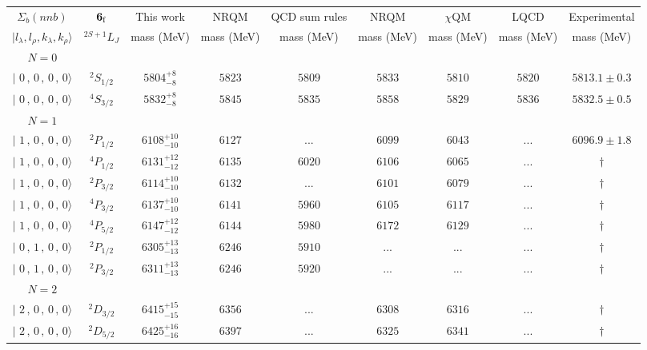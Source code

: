 \begin{tabular}{c c| c c c c c c c}\hline \hline
$\Sigma_{b}(nnb)$& ${\bf {6}}_{\rm f}$& This work   &   NRQM \cite{Yoshida2015}     &  QCD sum rules \cite{Liu2008, Mao2015, Chen2016}      &  NRQM \cite{Roberts2008}    & $\chi$QM \cite{Kim2021}        & LQCD \cite{Mohanta2020}     & Experimental  \\ 
 $\vert l_{\lambda}, l_{\rho}, k_{\lambda}, k_{\rho} \rangle$ & $^{2S+1}L_{J}$ & mass (MeV)  &   mass (MeV)  &  mass (MeV)  &  mass (MeV) & mass (MeV) & mass (MeV) &      mass (MeV) \\ \hline
\hline
 $N=0$  &  &  &  &  &  \\ 
$\vert \,\,0\,,\,0\,,\,0\,,\,0 \rangle $ & $^{2}S_{1/2}$ & $5804^{+8}_{-8}$ & $5823$ & $5809$ & $5833$ & $5810$ & $5820$ & $5813.1\pm 0.3$ \\ 
$\vert \,\,0\,,\,0\,,\,0\,,\,0 \rangle $ & $^{4}S_{3/2}$ & $5832^{+8}_{-8}$ & $5845$ & $5835$ & $5858$ & $5829$ & $5836$ & $5832.5\pm 0.5$ \\ 
\hline
 $N=1$  &  &  &  &  &  \\ 
$\vert \,\,1\,,\,0\,,\,0\,,\,0 \rangle $ & $^{2}P_{1/2}$ & $6108^{+10}_{-10}$ & $6127$ & ... & $6099$ & $6043$ & ... & $6096.9\pm 1.8$ \\ 
$\vert \,\,1\,,\,0\,,\,0\,,\,0 \rangle $ & $^{4}P_{1/2}$ & $6131^{+12}_{-12}$ & $6135$ & $6020$ & $6106$ & $6065$ & ... & $\dagger$ \\ 
$\vert \,\,1\,,\,0\,,\,0\,,\,0 \rangle $ & $^{2}P_{3/2}$ & $6114^{+10}_{-10}$ & $6132$ & ... & $6101$ & $6079$ & ... & $\dagger$ \\ 
$\vert \,\,1\,,\,0\,,\,0\,,\,0 \rangle $ & $^{4}P_{3/2}$ & $6137^{+10}_{-10}$ & $6141$ & $5960$ & $6105$ & $6117$ & ... & $\dagger$ \\ 
$\vert \,\,1\,,\,0\,,\,0\,,\,0 \rangle $ & $^{4}P_{5/2}$ & $6147^{+12}_{-12}$ & $6144$ & $5980$ & $6172$ & $6129$ & ... & $\dagger$ \\ 
$\vert \,\,0\,,\,1\,,\,0\,,\,0 \rangle $ & $^{2}P_{1/2}$ & $6305^{+13}_{-13}$ & $6246$ & $5910$ & ... & ... & ... & $\dagger$ \\ 
$\vert \,\,0\,,\,1\,,\,0\,,\,0 \rangle $ & $^{2}P_{3/2}$ & $6311^{+13}_{-13}$ & $6246$ & $5920$ & ... & ... & ... & $\dagger$ \\ 
\hline
 $N=2$  &  &  &  &  &  \\ 
$\vert \,\,2\,,\,0\,,\,0\,,\,0 \rangle $ & $^{2}D_{3/2}$ & $6415^{+15}_{-15}$ & $6356$ & ... & $6308$ & $6316$ & ... & $\dagger$ \\ 
$\vert \,\,2\,,\,0\,,\,0\,,\,0 \rangle $ & $^{2}D_{5/2}$ & $6425^{+16}_{-16}$ & $6397$ & ... & $6325$ & $6341$ & ... & $\dagger$ \\ 

\end{tabular}

